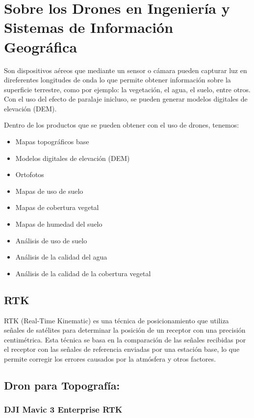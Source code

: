 \section{Sobre los Drones en Ingeniería y Sistemas de Información Geográfica}

  Son dispositivos aéreos que mediante un sensor o cámara pueden capturar luz en direferentes longitudes de onda lo que permite obtener información sobre la superficie terrestre, como por ejemplo: la vegetación, el agua, el suelo, entre otros. Con el uso del efecto de paralaje inicluso, se pueden generar modelos digitales de elevación (DEM). 

  Dentro de los productos que se pueden obtener con el uso de drones, tenemos:
  \begin{itemize}
    \item Mapas topográficos base
    \item Modelos digitales de elevación (DEM)
    \item Ortofotos
    \item Mapas de uso de suelo
    \item Mapas de cobertura vegetal
    \item Mapas de humedad del suelo
    \item Análisis de uso de suelo
    \item Análisis de la calidad del agua
    \item Análisis de la calidad de la cobertura vegetal
  \end{itemize}

  \subsection{RTK}

  RTK (Real-Time Kinematic) es una técnica de posicionamiento que utiliza señales de satélites para determinar la posición de un receptor con una precisión centimétrica. Esta técnica se basa en la comparación de las señales recibidas por el receptor con las señales de referencia enviadas por una estación base, lo que permite corregir los errores causados por la atmósfera y otros factores.

  \subsection{Dron para Topografía:}

  \subsubsection{DJI Mavic 3 Enterprise RTK}

